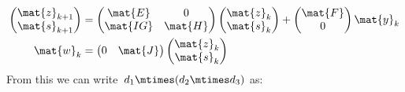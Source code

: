 \begin{equation*}
    \label{eq:dlin-6}
    \begin{aligned}
        \begin{pmatrix}
            \mat{z}_{k+1} \\
            \mat{s}_{k+1}
        \end{pmatrix}&=
        \begin{pmatrix}
            \mat{E}  & 0       \\
            \mat{IG} & \mat{H}
        \end{pmatrix}\begin{pmatrix}
                         \mat{z}_k\\ \mat{s}_k
        \end{pmatrix}+
        \begin{pmatrix}
            \mat{F}\\ 0
        \end{pmatrix}\mat{y}_k\\
        \mat{w}_k&=\begin{pmatrix}
                       0& \mat{J}
        \end{pmatrix}\begin{pmatrix}
                         \mat{z}_k\\ \mat{s}_k
        \end{pmatrix}
    \end{aligned}
\end{equation*}
From this we can write~$d_1\mtimes (d_2\mtimes d_3)$ as:
